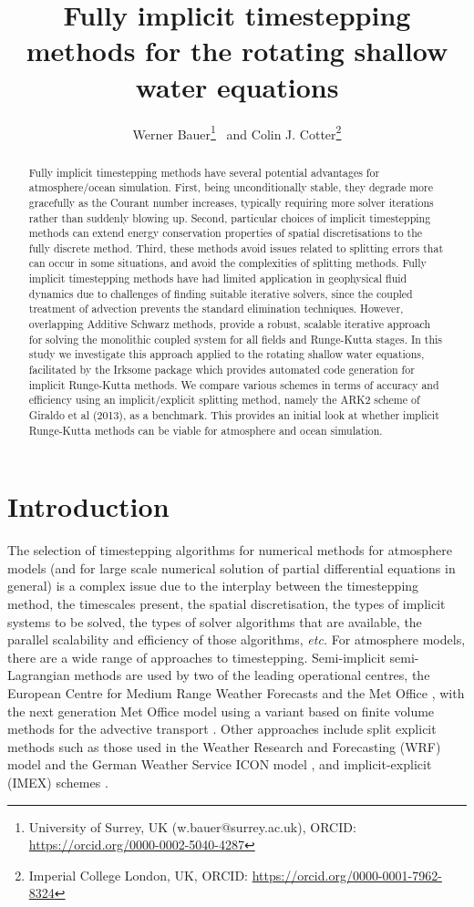 \documentclass[a4paper, 12pt]{article}
\title{Fully implicit timestepping methods for the rotating shallow water equations}
\author{Werner Bauer\footnote{University of Surrey, UK (w.bauer@surrey.ac.uk), ORCID: \url{https://orcid.org/0000-0002-5040-4287}} \ and
Colin J. Cotter\footnote{Imperial College London, UK, ORCID: \url{https://orcid.org/0000-0001-7962-8324}}}
\begin{document}
\maketitle

\begin{abstract}
Fully implicit timestepping methods have several potential advantages for atmosphere/ocean simulation. First, being unconditionally stable, they degrade more gracefully as the Courant number increases, typically requiring more solver iterations rather than suddenly blowing up. Second, particular choices of implicit timestepping methods can extend energy conservation properties of spatial discretisations to the fully discrete method. Third, these methods avoid issues related to splitting errors that can occur in some situations, and avoid the complexities of splitting methods.
Fully implicit timestepping methods have had limited application in
geophysical fluid dynamics due to challenges of finding suitable
iterative solvers, since the coupled treatment of advection prevents
the standard elimination techniques. However, overlapping Additive
Schwarz methods, provide a robust, scalable iterative approach for
solving the monolithic coupled system for all fields and Runge-Kutta
stages.
In this study we investigate this approach applied to the rotating
shallow water equations, facilitated by the Irksome package which
provides automated code generation for implicit Runge-Kutta
methods. We compare various schemes in terms of accuracy and
efficiency using an implicit/explicit splitting method, namely the
ARK2 scheme of Giraldo et al (2013), as a benchmark. This provides an
initial look at whether implicit Runge-Kutta methods can be viable for
atmosphere and ocean simulation.
\end{abstract}

\section{Introduction}

The selection of timestepping algorithms for numerical methods for
atmosphere models (and for large scale numerical solution of partial
differential equations in general) is a complex issue due to the
interplay between the timestepping method, the timescales present, the
spatial discretisation, the types of implicit systems to be solved,
the types of solver algorithms that are available, the parallel
scalability and efficiency of those algorithms, \emph{etc.} For
atmosphere models, there are a wide range of approaches to
timestepping. Semi-implicit semi-Lagrangian methods are used by two of
the leading operational centres, the European Centre for Medium Range
Weather Forecasts \citep{hortal2002development} and the Met Office
\citep{melvin2010inherently,wood2014inherently}, with the next
generation Met Office model using a variant based on finite volume
methods for the advective transport
\citep{melvin2019mixed,melvin2024mixed}. Other approaches include
split explicit methods \citep{klemp2007conservative} such as those
used in the Weather Research and Forecasting (WRF) model
\citep{skamarock2008description} and the German Weather Service ICON
model \citep{zangl2015icon}, and implicit-explicit (IMEX) schemes
\citep{vogl2019evaluation,giraldo2013implicit}.
\end{document}
